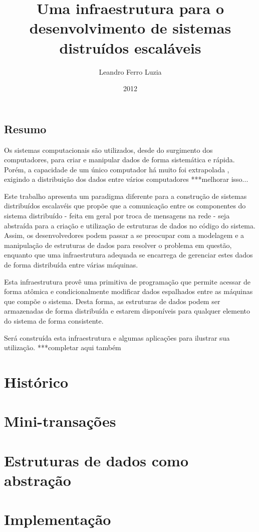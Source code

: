 \documentclass[a4paper,11pt]{report}
\author{Leandro Ferro Luzia}
\title{Uma infraestrutura para o desenvolvimento de sistemas distruídos escaláveis}
\begin{document}
\date{2012}
\maketitle
\section*{Resumo}
Os sistemas computacionais são utilizados, desde do surgimento dos computadores, para criar e manipular dados de forma sistemática e rápida. Porém, a capacidade de um único computador há muito foi extrapolada , exigindo a distribuição dos dados entre vários computadores ***melhorar isso...

Este trabalho apresenta um paradigma diferente para a construção de sistemas distribuídos escalavéis que propõe que a comunicação entre os componentes do sistema distribuído - feita em geral por troca de mensagens na rede - seja abstraída para a criação e utilização de estruturas de dados no código do sistema. Assim, os desenvolvedores podem passar a se preocupar com a modelagem e a manipulação de estruturas de dados para resolver o problema em questão, enquanto que uma infraestrutura adequada se encarrega de gerenciar estes dados de forma distribuída entre várias máquinas.

Esta infraestrutura provê uma primitiva de programação que permite acessar de forma atômica e condicionalmente modificar dados espalhados entre as máquinas que compõe o sistema. Desta forma, as estruturas de dados podem ser armazenadas de forma distribuída e estarem disponíveis para qualquer elemento do sistema de forma consistente.

Será construída esta infraestrutura e algumas aplicações para ilustrar sua utilização. ***completar aqui também
\tableofcontents
\listoftables
\listoffigures
\chapter{Histórico}
\chapter{Mini-transações}
\chapter{Estruturas de dados como abstração}
\chapter{Implementação}
\end{document}
